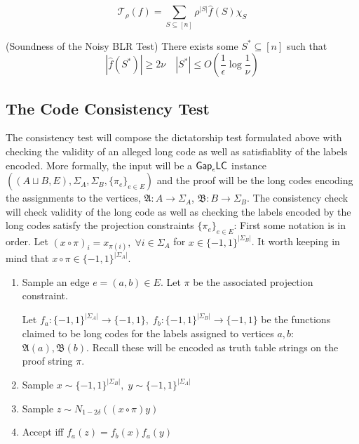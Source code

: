 \begin{equation}
  \mathcal{T}_\rho(f) = \sum_{S \subseteq [n]} \rho^{|S|}\widehat{f}(S)\chi_S
\end{equation}

%
\begin{corollary}
  (Soundness of the Noisy BLR Test) There exists some $S^* \subseteq [n]$ such that
  \begin{equation}
    |\widehat{f}(S^*)| \geq 2\nu \quad |S^*| \leq O\left(\frac{1}{\epsilon}\log{\frac{1}{\nu}}\right)
  \end{equation}
\end{corollary}

\subsection{The Code Consistency Test}
The consistency test will compose the dictatorship test formulated above with checking the validity of an alleged long code as well as satisfiablity of the labels encoded. More formally, the input will be a $\mathsf{Gap}_\epsilon\mathsf{LC}$ instance $((A\sqcup B,E),\Sigma_A,\Sigma_B,\{\pi_e\}_{e \in E})$ and the proof will be the long codes encoding the assignments to the vertices, $\mathfrak{A}: A \rightarrow \Sigma_A$, $\mathfrak{B}: B \rightarrow \Sigma_B$. The consistency check will check validity of the long code as well as checking the labels encoded by the long codes satisfy the projection constraints $\{\pi_e\}_{e \in E}$: First some notation is in order. Let $(x \circ \pi)_i = x_{\pi(i)}, \; \forall i \in \Sigma_A$ for $x \in \{-1,1\}^{|\Sigma_B|}$. It worth keeping in mind that $x \circ \pi \in \{-1,1\}^{|\Sigma_A|}$.

\begin{enumerate}
  \item Sample an edge $e = (a,b) \in E$. Let $\pi$ be the associated projection constraint.

  \noindent Let $f_a:\{-1,1\}^{|\Sigma_A|} \rightarrow \{-1,1\}, \; f_b:\{-1,1\}^{|\Sigma_B|} \rightarrow \{-1,1\}$ be the functions claimed to be long codes for the labels assigned to vertices $a,b$: $\mathfrak{A}(a),\mathfrak{B}(b)$. Recall these will be encoded as truth table strings on the proof string $\pi$.
  \item Sample $x \sim \{-1,1\}^{|\Sigma_B|}, \; y \sim \{-1,1\}^{|\Sigma_A|}$
  \item Sample $z \sim N_{1 - 2\delta}((x \circ \pi)y)$
  \item Accept iff $f_a(z) = f_b(x)f_a(y)$
\end{enumerate}

